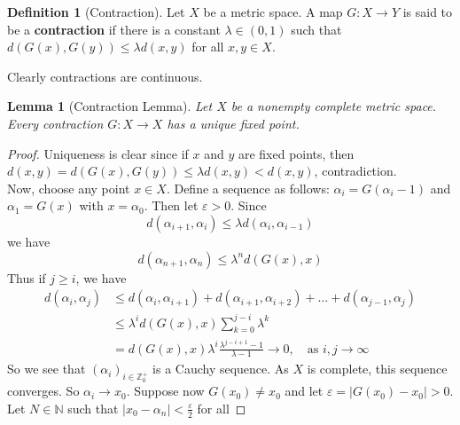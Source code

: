 \documentclass[reqno]{amsart}
\theoremstyle{plain}%
\newtheorem{lemma}[theorem]{Lemma}
\theoremstyle{definition}
\newtheorem{definition}[theorem]{Definition}
\theoremstyle{remark}
\begin{document}
        \begin{definition}[Contraction]
        Let $X$ be a metric space. A map $G  \colon X \to Y$ is said to be
        a \textbf{contraction} if there is a constant $\lambda \in \left( 0,1 \right) $ 
        such that $d\left( G(x),G(y) \right) \le \lambda d(x,y)$ for all
        $x,y \in X$. 
        \end{definition}
        Clearly contractions are continuous.

        \begin{lemma}[Contraction Lemma]
        Let $X$ be a nonempty complete metric space. Every contraction $G
         \colon X \to X$ has a unique fixed point.
        \end{lemma}

        \begin{proof}
        Uniqueness is clear since if $x$ and $y$ are fixed points, then
        $d\left( x,y \right) = d\left( G(x), G(y) \right) \le 
        \lambda d(x,y) < d(x,y)$, contradiction.\\
        Now, choose any point $x \in X$. Define a sequence as follows:
        $\alpha_i = G \left( \alpha_i-1 \right)$ and
        $\alpha_1 = G(x)$ with $x = \alpha_0$. Then let $\varepsilon >0$. 
        Since
        \[
        d\left( \alpha_{i+1}, \alpha_i \right) 
        \le \lambda d\left( \alpha_i, \alpha_{i-1} \right) 
        \] 
        we have
        \[
        d\left( \alpha_{n+1}, \alpha_n \right) \le 
        \lambda^{n} d\left( G(x),x \right) 
        \] 
        Thus if $j \ge i$, we have
        \begin{align*}
            d \left( \alpha_i, \alpha_j \right) 
            &\le d \left( \alpha_i, \alpha_{i+1} \right) 
            + d \left( \alpha_{i+1}, \alpha_{i+2} \right) + \ldots +
            d\left( \alpha_{j-1}, \alpha_j \right)\\
            &\le \lambda^{i} d\left( G(x),x \right) \sum_{k=0}^{j-i} \lambda^{k}\\
            &= d \left( G(x),x \right) \lambda^{i} \frac{\lambda^{j-i+1}
            - 1}{\lambda - 1} \to 0, \quad \text{as } i,j \to \infty
        \end{align*}
        So we see that $\left( \alpha_i \right)_{i
        \in \mathbb{Z}_0^{+}}$ is a Cauchy sequence. As $X$ is complete, this
        sequence converges. So $\alpha_i \to x_0$. Suppose now
        $G(x_0) \neq x_0$ and let $\varepsilon = \left| G(x_0)-x_0 \right| >0 $.
        Let $N \in \mathbb{N}$ such that
        $\left| x_0 - \alpha_n \right| < \frac{\varepsilon}{2}$ for all

\end{proof}
\end{document}
